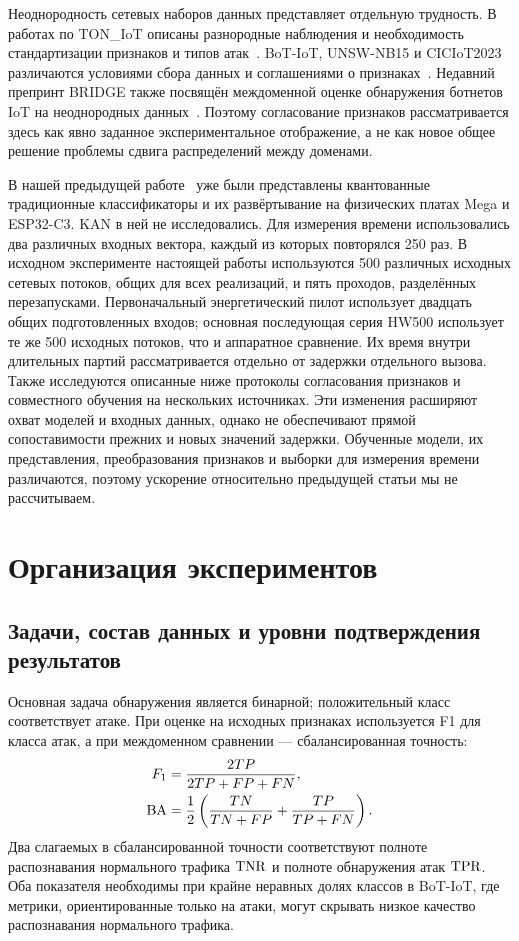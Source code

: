 Неоднородность сетевых наборов данных представляет отдельную трудность. В работах по TON\_IoT описаны разнородные наблюдения и необходимость стандартизации признаков и типов атак~\cite{moustafa2021networkton,alsaedi2020ton,booij2022heterogeneity}. BoT-IoT, UNSW-NB15 и CICIoT2023 различаются условиями сбора данных и соглашениями о признаках~\cite{koroniotis2019botiot,moustafa2015unsw,neto2023ciciot}. Недавний препринт BRIDGE также посвящён междоменной оценке обнаружения ботнетов IoT на неоднородных данных~\cite{bhilwarawala2026bridge}. Поэтому согласование признаков рассматривается здесь как явно заданное экспериментальное отображение, а не как новое общее решение проблемы сдвига распределений между доменами.

В нашей предыдущей работе~\cite{debernardis2026lightweight} уже были представлены квантованные традиционные классификаторы и их развёртывание на физических платах Mega и ESP32-C3. KAN в ней не исследовались. Для измерения времени использовались два различных входных вектора, каждый из которых повторялся 250 раз. В исходном эксперименте настоящей работы используются 500 различных исходных сетевых потоков, общих для всех реализаций, и пять проходов, разделённых перезапусками. Первоначальный энергетический пилот использует двадцать общих подготовленных входов; основная последующая серия HW500 использует те же 500 исходных потоков, что и аппаратное сравнение. Их время внутри длительных партий рассматривается отдельно от задержки отдельного вызова. Также исследуются описанные ниже протоколы согласования признаков и совместного обучения на нескольких источниках. Эти изменения расширяют охват моделей и входных данных, однако не обеспечивают прямой сопоставимости прежних и новых значений задержки. Обученные модели, их представления, преобразования признаков и выборки для измерения времени различаются, поэтому ускорение относительно предыдущей статьи мы не рассчитываем.

\section{Организация экспериментов}
\subsection{Задачи, состав данных и уровни подтверждения результатов}
Основная задача обнаружения является бинарной; положительный класс соответствует атаке. При оценке на исходных признаках используется F1 для класса атак, а при междоменном сравнении --- сбалансированная точность:
\begin{equation}
\begin{split}
F_1&=\frac{2TP}{2TP+FP+FN},\\
\operatorname{BA}&=\frac{1}{2}\left(\frac{TN}{TN+FP}+\frac{TP}{TP+FN}\right).
\end{split}
\label{eq:metrics}
\end{equation}
Два слагаемых в сбалансированной точности соответствуют полноте распознавания нормального трафика $\operatorname{TNR}$ и полноте обнаружения атак $\operatorname{TPR}$. Оба показателя необходимы при крайне неравных долях классов в BoT-IoT, где метрики, ориентированные только на атаки, могут скрывать низкое качество распознавания нормального трафика.

